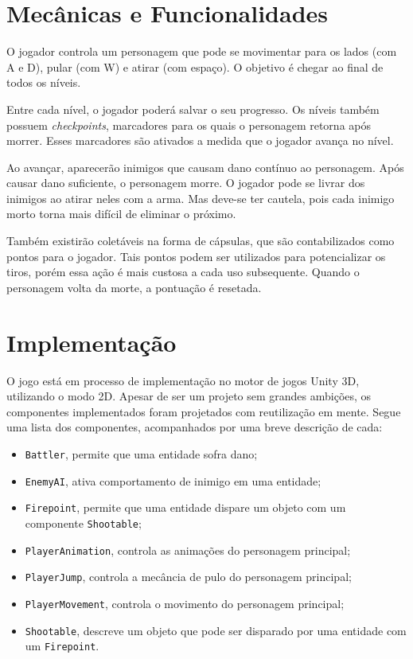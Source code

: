 \documentclass[a4paper]{article}
\begin{document}
\section{Mecânicas e Funcionalidades}

O jogador controla um personagem que pode se movimentar para os lados (com A e D), pular (com W) e atirar (com espaço). O objetivo é chegar ao final de todos os níveis.

Entre cada nível, o jogador poderá salvar o seu progresso. Os níveis também possuem \emph{checkpoints}, marcadores para os quais o personagem retorna após morrer. Esses marcadores são ativados a medida que o jogador avança no nível.

Ao avançar, aparecerão inimigos que causam dano contínuo ao personagem. Após causar dano suficiente, o personagem morre. O jogador pode se livrar dos inimigos ao atirar neles com a arma. Mas deve-se ter cautela, pois cada inimigo morto torna mais difícil de eliminar o próximo. 

Também existirão coletáveis na forma de cápsulas, que são contabilizados como pontos para o jogador. Tais pontos podem ser utilizados para potencializar os tiros, porém essa ação é mais custosa a cada uso subsequente. Quando o personagem volta da morte, a pontuação é resetada.


\section{Implementação}

O jogo está em processo de implementação no motor de jogos Unity 3D, utilizando o modo 2D. Apesar de ser um projeto sem grandes ambições, os componentes implementados foram projetados com reutilização em mente.
Segue uma lista dos componentes, acompanhados por uma breve descrição de cada:
\begin{itemize}
	\item \texttt{Battler}, permite que uma entidade sofra dano;
	\item \texttt{EnemyAI}, ativa comportamento de inimigo em uma entidade;
	\item \texttt{Firepoint}, permite que uma entidade dispare um objeto com um componente \texttt{Shootable};
	\item \texttt{PlayerAnimation}, controla as animações do personagem principal;
	\item \texttt{PlayerJump}, controla a mecância de pulo do personagem principal;
	\item \texttt{PlayerMovement}, controla o movimento do personagem principal;
	\item \texttt{Shootable}, descreve um objeto que pode ser disparado por uma entidade com um \texttt{Firepoint}.
\end{itemize}
\end{document}
